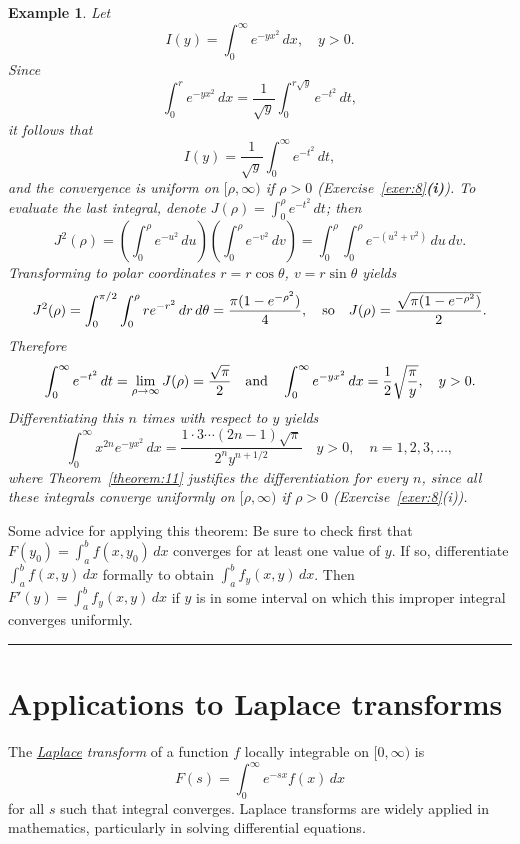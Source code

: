 \documentclass{article}
\newtheorem{example}{Example}
\newcommand{\place}{\bigskip\hrule\bigskip\noindent}
\begin{document}
\begin{example}  \label{example:12}  \rm
Let
$$
I(y)=\int_{0}^{\infty}e^{-yx^{2}}\,dx, \quad y>0.
$$
Since
$$
\int_{0}^{r}e^{-yx^{2}}\,dx=\frac{1}{\sqrt{y}}
\int_{0}^{r\sqrt{y}} e^{-t^{2}}\,dt,
$$
it follows that
$$
I(y)=\frac{1}{\sqrt{y}}\int_{0}^{\infty}e^{-t^{2}}\,dt,
$$
and the convergence is uniform on $[\rho,\infty)$ if $\rho>0$
(Exercise~\ref{exer:8}{\bf(i)}).
To evaluate the last integral, denote
$J(\rho)=\int_{0}^{\rho}e^{-t^{2}}\,dt$;
then
$$
J^{2}(\rho)=\left(\int_{0}^{\rho}e^{-u^{2}}\,du\right)
\left(\int_{0}^{\rho}e^{-v^{2}}\,dv\right)
=\int_{0}^{\rho}\int_{0}^{\rho}e^{-(u^{2}+v^{2})}\,du\,dv.
$$
Transforming to polar coordinates $r=r\cos\theta$, $v=r\sin\theta$
 yields
$$
J^{2}(\rho)=\int_{0}^{\pi/2}\int_{0}^{\rho} re^{-r^{2}}\,dr\,d\theta
=\frac{\pi(1-e^{-\rho^{2}})}{4},
\text{\quad so\quad}
J(\rho)=\frac{\sqrt{\pi(1-e^{-\rho^{2}})}}{2}.
$$
Therefore
$$
\int_{0}^{\infty}e^{-t^{2}}\,dt=\lim_{\rho\to\infty}J(\rho)=
\frac{\sqrt{\pi}}{2}\text{\quad and\quad}
\int_{0}^{\infty}e^{-yx^{2}}\,dx= \frac{1}{2}\sqrt{\frac{\pi}{y}},
\quad y>0.
$$
 Differentiating this $n$ times with respect to
$y$ yields
$$
\int_{0}^{\infty}x^{2n}e^{-yx^{2}}\,dx=
\frac{1\cdot3\cdots(2n-1)\sqrt{\pi}}{2^{n}y^{n+1/2}}\quad y>0,\quad
n=1,2,3, \dots,
$$
where Theorem~\ref{theorem:11} justifies the differentiation for every
$n$, since all these integrals
 converge uniformly on $[\rho,\infty)$  if
$\rho>0$ (Exercise~\ref{exer:8}(i)).
\end{example}

Some advice for applying this theorem: Be sure to check first
that $F(y_{0})=\int_{a}^{b}f(x,y_{0})\,dx$ converges for at least one value
of
$y$. If so, differentiate $\int_{a}^{b}f(x,y)\,dx$ formally to obtain
$\int_{a}^{b}f_{y}(x,y)\,dx$. Then   $F'(y)=\int_{a}^{b}f_{y}(x,y)\,dx$
if $y$ is in some interval on which  this improper  integral converges
uniformly.


\place %

\section{Applications to Laplace transforms} \label{section:laplace}
\medskip

The
\href{http://www-history.mcs.st-and.ac.uk/Biographies/Laplace.html}
{\emph{Laplace}}
\emph{transform}  of a function $f$ locally integrable
   on $[0,\infty)$ is
$$
F(s)=\int_{0}^{\infty}e^{-sx}f(x)\,dx
$$
for all   $s$ such that integral converges. Laplace
transforms are widely applied in mathematics, particularly in solving
differential equations.
\end{document}
